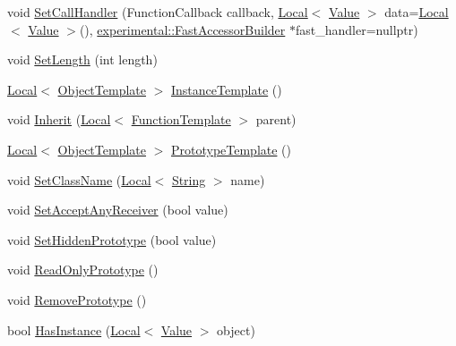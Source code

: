\begin{DoxyCompactItemize}
\item 
void \hyperlink{classv8_1_1_function_template_a3397f180b72a667ae64b31a3b371d574}{Set\+Call\+Handler} (Function\+Callback callback, \hyperlink{classv8_1_1_local}{Local}$<$ \hyperlink{classv8_1_1_value}{Value} $>$ data=\hyperlink{classv8_1_1_local}{Local}$<$ \hyperlink{classv8_1_1_value}{Value} $>$(), \hyperlink{classv8_1_1experimental_1_1_fast_accessor_builder}{experimental\+::\+Fast\+Accessor\+Builder} $\ast$fast\+\_\+handler=nullptr)
\item 
void \hyperlink{classv8_1_1_function_template_a5faf23b28ee3480b23ce054d0f389a75}{Set\+Length} (int length)
\item 
\hyperlink{classv8_1_1_local}{Local}$<$ \hyperlink{classv8_1_1_object_template}{Object\+Template} $>$ \hyperlink{classv8_1_1_function_template_a00dd9725566908e8fd14064542f5a781}{Instance\+Template} ()
\item 
void \hyperlink{classv8_1_1_function_template_abc11c462facf11bafd541892815c5425}{Inherit} (\hyperlink{classv8_1_1_local}{Local}$<$ \hyperlink{classv8_1_1_function_template}{Function\+Template} $>$ parent)
\item 
\hyperlink{classv8_1_1_local}{Local}$<$ \hyperlink{classv8_1_1_object_template}{Object\+Template} $>$ \hyperlink{classv8_1_1_function_template_aa2bcc2652b5f0fdbc666d943ccf72021}{Prototype\+Template} ()
\item 
void \hyperlink{classv8_1_1_function_template_a491e77dc7ceb5b0fe75880d11f2dbe9e}{Set\+Class\+Name} (\hyperlink{classv8_1_1_local}{Local}$<$ \hyperlink{classv8_1_1_string}{String} $>$ name)
\item 
void \hyperlink{classv8_1_1_function_template_a5ffdc68d8035b02ed7583950b76ef91f}{Set\+Accept\+Any\+Receiver} (bool value)
\item 
void \hyperlink{classv8_1_1_function_template_ade426e8a21d777ae6100e6c1aa7bfaee}{Set\+Hidden\+Prototype} (bool value)
\item 
void \hyperlink{classv8_1_1_function_template_a91d2e0643e8c5a53ab1d75f7766c2422}{Read\+Only\+Prototype} ()
\item 
void \hyperlink{classv8_1_1_function_template_a4a184aca244174c7fe52d58871d3129e}{Remove\+Prototype} ()
\item 
bool \hyperlink{classv8_1_1_function_template_a90d838f3456d300bd19d2a2cb98645bd}{Has\+Instance} (\hyperlink{classv8_1_1_local}{Local}$<$ \hyperlink{classv8_1_1_value}{Value} $>$ object)
\end{DoxyCompactItemize}
